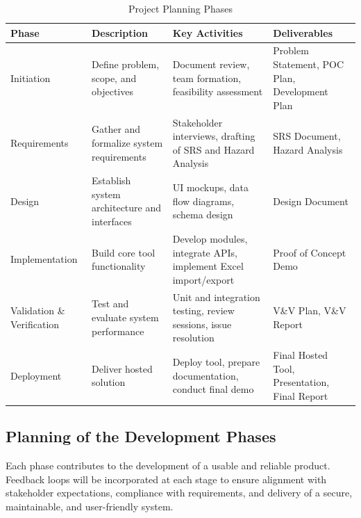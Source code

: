 \documentclass[12pt]{article}
\begin{document}
\begin{table}[H]
\centering
\caption{Project Planning Phases}
\begin{tabularx}{\textwidth}{|p{2.2cm}|X|X|X|}
\hline
\textbf{Phase} & \textbf{Description} & \textbf{Key Activities} & \textbf{Deliverables} \\ \hline
Initiation & Define problem, scope, and objectives & Document review, team formation, feasibility assessment & Problem Statement, POC Plan, Development Plan \\ \hline
Requirements & Gather and formalize system requirements & Stakeholder interviews, drafting of SRS and Hazard Analysis & SRS Document, Hazard Analysis \\ \hline
Design & Establish system architecture and interfaces & UI mockups, data flow diagrams, schema design & Design Document \\ \hline
Implementation & Build core tool functionality & Develop modules, integrate APIs, implement Excel import/export & Proof of Concept Demo \\ \hline
Validation \& Verification & Test and evaluate system performance & Unit and integration testing, review sessions, issue resolution & V\&V Plan, V\&V Report \\ \hline
Deployment & Deliver hosted solution & Deploy tool, prepare documentation, conduct final demo & Final Hosted Tool, Presentation, Final Report \\ \hline
\end{tabularx}
\end{table}

\subsection{Planning of the Development Phases}

Each phase contributes to the development of a usable and reliable product. Feedback loops will be incorporated at each stage to ensure alignment with stakeholder expectations, compliance with requirements, and delivery of a secure, maintainable, and user-friendly system.
\end{document}
